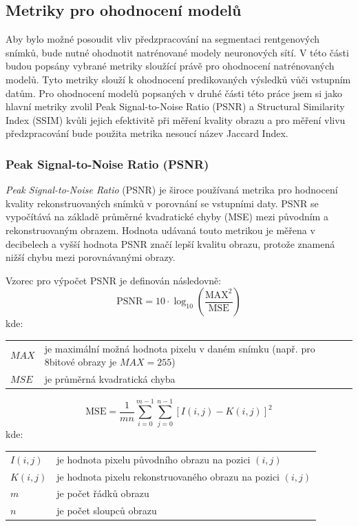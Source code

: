 \documentclass[male,czech,api_ing]{thesis}
\makeatletter
\newenvironment{conditions}[1][kde:]
    {#1 \begin{tabular}[t]{>{$}l<{$} @{${}={}$} >{\raggedright\arraybackslash}p{10cm}}}
    {\end{tabular}}
\makeatother
\begin{document}
\subsection{Metriky pro ohodnocení modelů}
Aby bylo možné posoudit vliv předzpracování na segmentaci rentgenových snímků, bude nutné ohodnotit natrénované modely neuronových sítí. V této části budou popsány vybrané metriky sloužící právě pro ohodnocení natrénovaných modelů. Tyto metriky slouží k ohodnocení predikovaných výsledků vůči vstupním datům. Pro ohodnocení modelů popsaných v druhé části této práce jsem si jako hlavní metriky zvolil Peak Signal-to-Noise Ratio (PSNR) a Structural Similarity Index (SSIM) kvůli jejich efektivitě při měření kvality obrazu a pro měření vlivu předzpracování bude použita metrika nesoucí název Jaccard Index.

\subsubsection{Peak Signal-to-Noise Ratio (PSNR)}
\textit{Peak Signal-to-Noise Ratio} (PSNR) je široce používaná metrika pro hodnocení kvality rekonstruovaných snímků v porovnání se vstupními daty. PSNR se vypočítává na základě průměrné kvadratické chyby (MSE) mezi původním a rekonstruovaným obrazem. Hodnota udávaná touto metrikou je měřena v decibelech a vyšší hodnota PSNR značí lepší kvalitu obrazu, protože znamená nižší chybu mezi porovnávanými obrazy. \cite{PSNRSSIM}

Vzorec pro výpočet PSNR je definován následovně:
\begin{equation}
    \text{PSNR} = 10 \cdot \log_{10} \left( \frac{\text{MAX}^2}{\text{MSE}} \right)
\end{equation}
\begin{conditions}
    MAX &  je maximální možná hodnota pixelu v daném snímku (např. pro 8bitové obrazy je $MAX = 255$) \\
    MSE &  je průměrná kvadratická chyba
\end{conditions}

\begin{equation}
    \text{MSE} = \frac{1}{mn} \sum_{i=0}^{m-1} \sum_{j=0}^{n-1} [I(i,j) - K(i,j)]^2
\end{equation}
\begin{conditions}
    I(i,j) &  je hodnota pixelu původního obrazu na pozici $(i, j)$ \\
    K(i,j) &  je hodnota pixelu rekonstruovaného obrazu na pozici $(i, j)$ \\
    m &  je počet řádků obrazu \\
    n &  je počet sloupců obrazu
\end{conditions}
\end{document}

